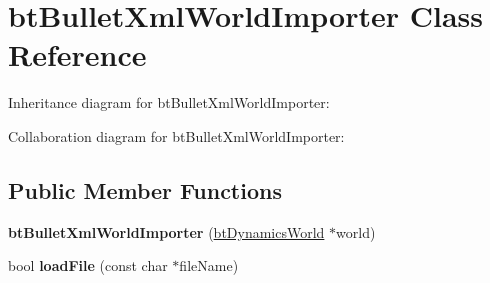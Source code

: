 \hypertarget{classbt_bullet_xml_world_importer}{\section{bt\+Bullet\+Xml\+World\+Importer Class Reference}
\label{classbt_bullet_xml_world_importer}
}


Inheritance diagram for bt\+Bullet\+Xml\+World\+Importer\+:


Collaboration diagram for bt\+Bullet\+Xml\+World\+Importer\+:
\subsection*{Public Member Functions}
\begin{DoxyCompactItemize}
\item 
\hypertarget{classbt_bullet_xml_world_importer_a99a2b5229e9b4adb2a3de6249ed4775e}{{\bfseries bt\+Bullet\+Xml\+World\+Importer} (\hyperlink{classbt_dynamics_world}{bt\+Dynamics\+World} $\ast$world)}\label{classbt_bullet_xml_world_importer_a99a2b5229e9b4adb2a3de6249ed4775e}

\item 
\hypertarget{classbt_bullet_xml_world_importer_a83bb8011fe2d0ce7fb389dc9544f28f9}{bool {\bfseries load\+File} (const char $\ast$file\+Name)}\label{classbt_bullet_xml_world_importer_a83bb8011fe2d0ce7fb389dc9544f28f9}

\end{DoxyCompactItemize}

